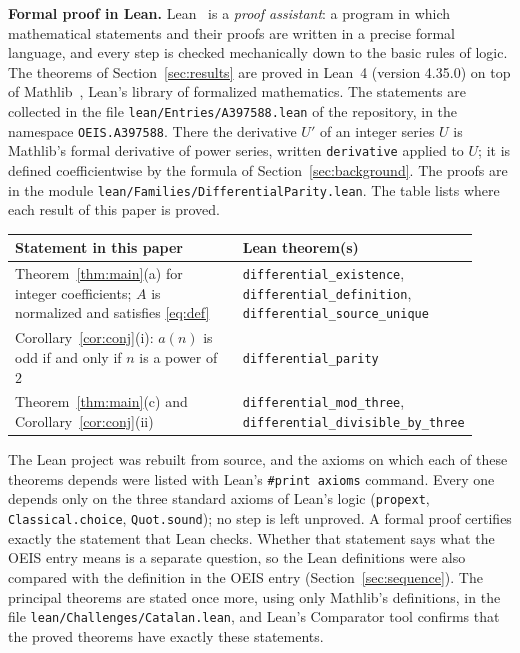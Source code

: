 \documentclass[11pt,a4paper]{article}
\theoremstyle{definition}
\theoremstyle{remark}
\newcommand{\para}[1]{\par\medskip\noindent\textbf{#1}\enspace}
\begin{document}
\para{Formal proof in Lean.}
Lean~\cite{lean} is a \emph{proof assistant}: a program in which mathematical statements and their proofs are written
in a precise formal language, and every step is checked mechanically down to the basic rules of logic. The theorems of Section~\ref{sec:results} are proved in Lean~4 (version 4.35.0) on top of
Mathlib~\cite{mathlib}, Lean's library of formalized mathematics. The statements are collected in the file \texttt{lean/Entries/A397588.lean} of the repository,
in the namespace \texttt{OEIS.A397588}. There the derivative $U'$ of an integer series $U$ is Mathlib's formal derivative of power series, written \texttt{derivative} applied to $U$; it is defined coefficientwise by the formula of Section~\ref{sec:background}. The proofs are in the module \texttt{lean/Families/DifferentialParity.lean}.
The table lists where each result of this paper is proved.
\begin{center}\small\renewcommand{\arraystretch}{1.25}
\begin{tabular}{>{\raggedright\arraybackslash}p{0.52\linewidth}>{\raggedright\arraybackslash}p{0.4\linewidth}}
\toprule
Statement in this paper & Lean theorem(s)\\
\midrule
Theorem~\ref{thm:main}(a) for integer coefficients; $A$ is normalized and satisfies \eqref{eq:def} & \texttt{differential\_\allowbreak{}existence}, \texttt{differential\_\allowbreak{}definition}, \texttt{differential\_\allowbreak{}source\_\allowbreak{}unique} \\
Corollary~\ref{cor:conj}(i): $a(n)$ is odd if and only if $n$ is a power of $2$ & \texttt{differential\_\allowbreak{}parity} \\
Theorem~\ref{thm:main}(c) and Corollary~\ref{cor:conj}(ii) & \texttt{differential\_\allowbreak{}mod\_\allowbreak{}three}, \texttt{differential\_\allowbreak{}divisible\_\allowbreak{}by\_\allowbreak{}three} \\
\bottomrule
\end{tabular}
\end{center}
The Lean project was rebuilt from source, and the axioms on which each of these theorems depends were listed with
Lean's \texttt{\#print axioms} command. Every one depends only on the three standard axioms of Lean's logic
(\texttt{propext}, \texttt{Classical.choice}, \texttt{Quot.sound}); no step is left unproved. A formal proof certifies
exactly the statement that Lean checks. Whether that statement says what the OEIS entry means is a separate question,
so the Lean definitions were also compared with the definition in the OEIS entry
(Section~\ref{sec:sequence}). The principal theorems are stated once more, using only Mathlib's definitions, in the
file \texttt{lean/Challenges/Catalan.lean}, and Lean's Comparator tool confirms that the
proved theorems have exactly these statements.
\end{document}
